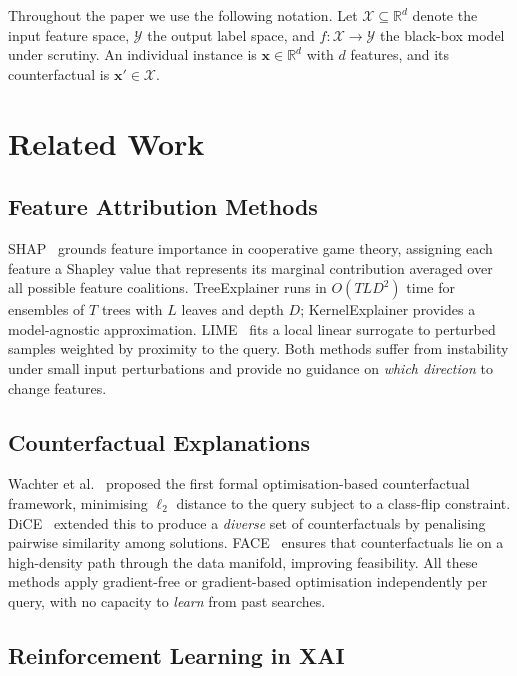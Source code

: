 \documentclass[conference]{IEEEtran}
\newcommand{\R}{\mathbb{R}}
\newcommand{\Xspace}{\mathcal{X}}
\newcommand{\Yspace}{\mathcal{Y}}
\newcommand{\bx}{\mathbf{x}}
\newcommand{\bxp}{\mathbf{x}'}
\begin{document}
\noindent
Throughout the paper we use the following notation. Let $\Xspace \subseteq
\R^d$ denote the input feature space, $\Yspace$ the output label space, and
$f: \Xspace \rightarrow \Yspace$ the black-box model under scrutiny. An
individual instance is $\bx \in \R^d$ with $d$ features, and its counterfactual
is $\bxp \in \Xspace$.

\section{Related Work}
\label{sec:related}

\subsection{Feature Attribution Methods}

SHAP~\cite{lundberg2017shap} grounds feature importance in cooperative game
theory, assigning each feature a Shapley value that represents its marginal
contribution averaged over all possible feature coalitions. TreeExplainer runs
in $O(TLD^2)$ time for ensembles of $T$ trees with $L$ leaves and depth $D$;
KernelExplainer provides a model-agnostic approximation. LIME~\cite{ribeiro2016lime}
fits a local linear surrogate to perturbed samples weighted by proximity to the
query. Both methods suffer from instability under small input perturbations and
provide no guidance on \emph{which direction} to change features.

\subsection{Counterfactual Explanations}

Wachter et al.~\cite{wachter2017counter} proposed the first formal
optimisation-based counterfactual framework, minimising $\ell_2$ distance to the
query subject to a class-flip constraint. DiCE~\cite{mothilal2020dice} extended
this to produce a \emph{diverse} set of counterfactuals by penalising pairwise
similarity among solutions. FACE~\cite{poyiadzi2020face} ensures that
counterfactuals lie on a high-density path through the data manifold, improving
feasibility. All these methods apply gradient-free or gradient-based optimisation
independently per query, with no capacity to \emph{learn} from past searches.

\subsection{Reinforcement Learning in XAI}
\end{document}
